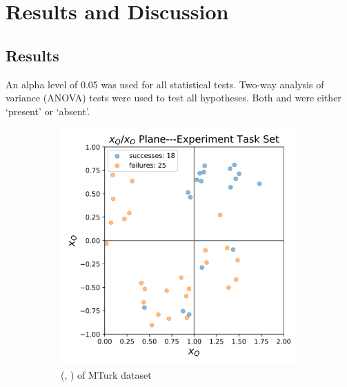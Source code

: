 \section{Results and Discussion} \label{sec:results_discussion}
\subsection{Results} \label{sec:results}
An alpha level of 0.05 was used for all statistical tests. Two-way analysis of variance (ANOVA) tests were used to test all hypotheses. Both \xQ{} and \xO{} were either `present' or `absent'.
\begin{figure}[tbp]
    \centering
    \begin{subfigure}[b]{0.30\linewidth}
        \centering
        \includegraphics[width=0.9\linewidth]{Figures/xQxO_plane_experiment_set.png}
        \vfill
        \caption{(\xQ{}, \xO{}) of MTurk dataset}
        \label{fig:exp_set}
    \end{subfigure}%
    \hfill
    \begin{subfigure}[b]{0.30\linewidth}
        \centering

\end{subfigure}
\end{figure}
